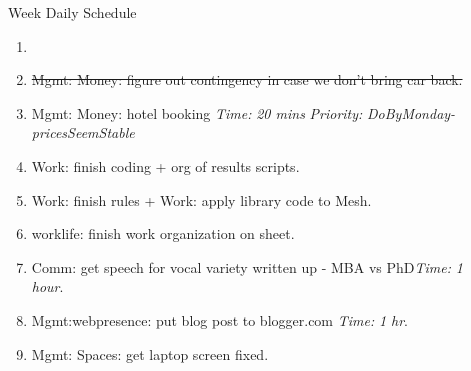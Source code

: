 \documentclass[serif, mathserif, final]{beamer}
\newcommand{\doneTask}[1]{\item \sout{#1}}
\newcommand{\timeEst}[1]{\textit{Time:} \textit{#1}}
\newcommand{\priority}[1]{\textit{Priority:} \textit{#1}}
\begin{document}
\begin{frame}{}
\begin{columns}
\begin{column}{0.50\linewidth}
\begin{block}{Week Daily Schedule}
\begin{enumerate}
\item \tiny \doneTask{Mgmt: Money: figure out contingency in case we don't bring car back. }
\item \tiny Mgmt: Money: hotel booking \timeEst{20 mins} \priority{DoByMonday-pricesSeemStable} 

\item \tiny Work: finish coding + org of results scripts. 
\item \tiny Work: finish rules  +  Work: apply library code to Mesh. 
\item \tiny worklife: finish work organization on sheet. 

\item \tiny Comm: get speech for vocal variety written up - MBA vs PhD\timeEst{1 hour}. 
\item \tiny Mgmt:webpresence: put blog post to blogger.com \timeEst{1 hr}.  

\item \tiny Mgmt: Spaces: get laptop screen fixed. 

\end{enumerate} 
\end{block} 


\end{column}%

\begin{column}{0.20\linewidth} 


\end{column}
\end{columns}
\end{frame}
\end{document}
